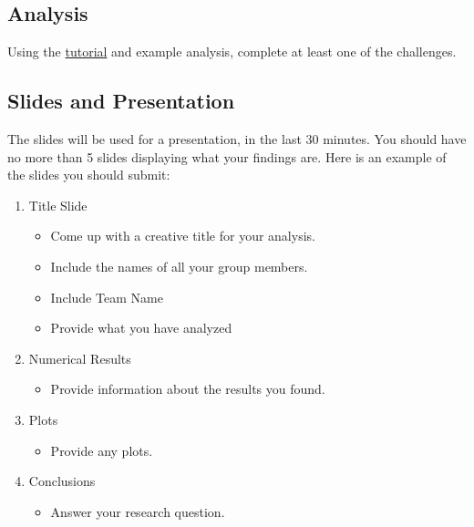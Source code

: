 \documentclass[
  letterpaper,
]{report}
\providecommand{\tightlist}{%
  \setlength{\itemsep}{0pt}\setlength{\parskip}{0pt}}\usepackage{longtable,booktabs,array}
\begin{document}
\subsection{Analysis}\label{analysis}

Using the
\href{https://www.inqs.info/ci_datathon_25/tutorial.html}{tutorial} and
example analysis, complete at least one of the challenges.

\subsection{Slides and Presentation}\label{slides-and-presentation}

The slides will be used for a presentation, in the last 30 minutes. You
should have no more than 5 slides displaying what your findings are.
Here is an example of the slides you should submit:

\begin{enumerate}
\def\labelenumi{\arabic{enumi}.}
\tightlist
\item
  Title Slide

  \begin{itemize}
  \tightlist
  \item
    Come up with a creative title for your analysis.
  \item
    Include the names of all your group members.
  \item
    Include Team Name
  \item
    Provide what you have analyzed
  \end{itemize}
\item
  Numerical Results

  \begin{itemize}
  \tightlist
  \item
    Provide information about the results you found.
  \end{itemize}
\item
  Plots

  \begin{itemize}
  \tightlist
  \item
    Provide any plots.
  \end{itemize}
\item
  Conclusions

  \begin{itemize}
  \tightlist
  \item
    Answer your research question.
  \end{itemize}
\end{enumerate}
\end{document}
